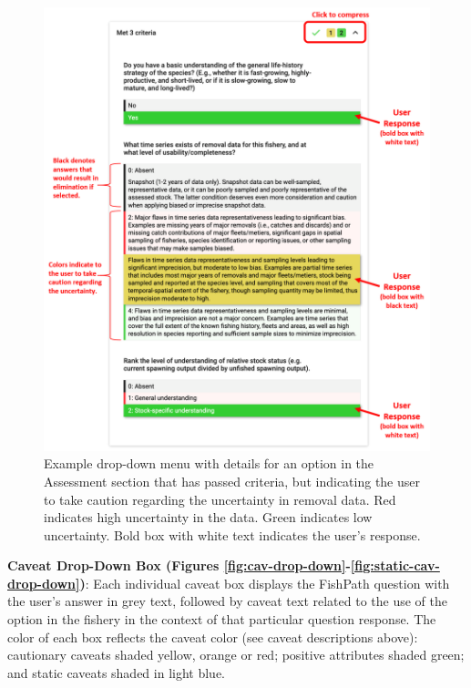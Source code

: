 \documentclass[
  11pt,
]{book}
\begin{document}
\begin{figure}

{\centering \includegraphics[width=0.75\linewidth]{images/assessment-crit-drop-down} 

}

\caption{Example drop-down menu with details for an option in the Assessment section that has passed criteria, but indicating the user to take caution regarding the uncertainty in removal data. Red indicates high uncertainty in the data. Green indicates low uncertainty. Bold box with white text indicates the user’s response.}\label{fig:assessment-crit-drop-down}
\end{figure}

\textbf{Caveat Drop-Down Box (Figures \ref{fig:cav-drop-down}-\ref{fig:static-cav-drop-down})}: Each individual caveat box displays the FishPath question with the user's answer in grey text, followed by caveat text related to the use of the option in the fishery in the context of that particular question response. The color of each box reflects the caveat color (see caveat descriptions above): cautionary caveats shaded yellow, orange or red; positive attributes shaded green; and static caveats shaded in light blue.
\end{document}
